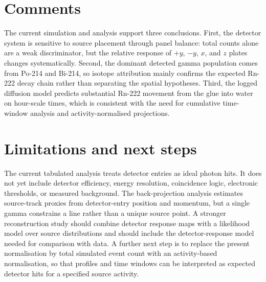 \documentclass[11pt,a4paper]{article}
\begin{document}
\section{Comments}

The current simulation and analysis support three conclusions.
First, the detector system is sensitive to source placement through panel
balance: total counts alone are a weak discriminator, but the relative
response of \(+y\), \(-y\), \(x\), and \(z\) plates changes systematically.
Second, the dominant detected gamma population comes from Po-214 and Bi-214,
so isotope attribution mainly confirms the expected Rn-222 decay chain
rather than separating the spatial hypotheses.  Third, the logged diffusion
model predicts substantial Rn-222 movement from the glue into water on
hour-scale times, which is consistent with the need for cumulative
time-window analysis and activity-normalised projections.

\section{Limitations and next steps}

The current tabulated analysis treats detector entries as ideal photon hits.
It does not yet include detector efficiency, energy resolution, coincidence
logic, electronic thresholds, or measured background.  The back-projection
analysis estimates source-track proxies from detector-entry position and
momentum, but a single gamma constrains a line rather than a unique source
point.  A stronger reconstruction study should combine detector response
maps with a likelihood model over source distributions and should include
the detector-response model needed for comparison with data.  A further next
step is to replace the present normalisation by total simulated event count
with an activity-based normalisation, so that profiles and time windows can
be interpreted as expected detector hits for a specified source activity.
\end{document}
